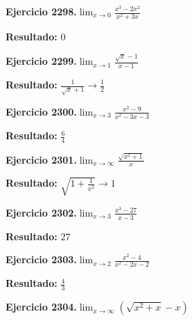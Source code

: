 \documentclass[10pt,a4paper]{article}
\begin{document}
\begin{ejbox}
\textbf{Ejercicio 2298.}\quad $\lim_{x\to 0} \frac{x^3-2x^2}{x^2+3x}$
\end{ejbox}

\begin{solbox}
\textbf{Resultado:} \(\displaystyle 0\)
\end{solbox}

\begin{ejbox}
\textbf{Ejercicio 2299.}\quad $\lim_{x\to 1} \frac{\sqrt{x}-1}{x-1}$
\end{ejbox}

\begin{solbox}
\textbf{Resultado:} \(\displaystyle \frac{1}{\sqrt{x}+1} \to \frac{1}{2}\)
\end{solbox}

\newpage
\begin{ejbox}
\textbf{Ejercicio 2300.}\quad $\lim_{x\to 3} \frac{x^2-9}{x^2-3x-3}$
\end{ejbox}

\begin{solbox}
\textbf{Resultado:} \(\displaystyle \frac{6}{4}\)
\end{solbox}

\begin{ejbox}
\textbf{Ejercicio 2301.}\quad $\lim_{x\to \infty} \frac{\sqrt{x^2+1}}{x}$
\end{ejbox}

\begin{solbox}
\textbf{Resultado:} \(\displaystyle \sqrt{1+\frac{1}{x^2}} \to 1\)
\end{solbox}

\begin{ejbox}
\textbf{Ejercicio 2302.}\quad $\lim_{x\to 3} \frac{x^3-27}{x-3}$
\end{ejbox}

\begin{solbox}
\textbf{Resultado:} \(\displaystyle 27\)
\end{solbox}

\newpage
\begin{ejbox}
\textbf{Ejercicio 2303.}\quad $\lim_{x\to 2} \frac{x^2-4}{x^2-2x-2}$
\end{ejbox}

\begin{solbox}
\textbf{Resultado:} \(\displaystyle \frac{4}{3}\)
\end{solbox}

\begin{ejbox}
\textbf{Ejercicio 2304.}\quad $\lim_{x\to \infty} (\sqrt{x^2+x} - x)$
\end{ejbox}
\end{document}
